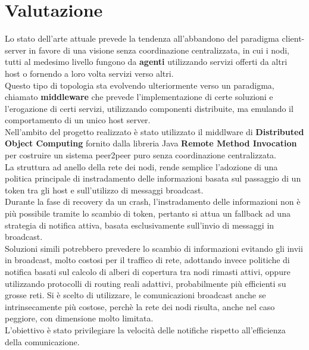\documentclass[10pt,a4paper]{article}
\begin{document}
\section{Valutazione}
Lo stato dell'arte attuale prevede la tendenza all'abbandono del paradigma client-server in favore di una visione senza coordinazione centralizzata, in cui i nodi, tutti al medesimo livello fungono da \textbf{agenti} utilizzando servizi offerti da altri host o fornendo a loro volta servizi verso altri.\\ Questo tipo di topologia sta evolvendo ulteriormente verso un paradigma, chiamato \textbf{middleware} che prevede l'implementazione di certe soluzioni e l'erogazione di certi servizi, utilizzando componenti distribuite, ma emulando il comportamento di un unico host server. \\ Nell'ambito del progetto realizzato è stato utilizzato il middlware di \textbf{Distributed Object Computing} fornito dalla libreria Java \textbf{Remote Method Invocation} per costruire un sistema peer2peer puro senza coordinazione centralizzata.\\La struttura ad anello della rete dei nodi, rende semplice l'adozione di una politica principale di instradamento delle informazioni basata sul passaggio di un token tra gli host e sull'utilizzo di messaggi broadcast.\\ Durante la fase di recovery da un crash, l'instradamento delle informazioni non è più possibile tramite lo scambio di token, pertanto si attua un fallback ad una strategia di notifica attiva, basata esclusivamente sull'invio di messaggi in broadcast.\\ Soluzioni simili potrebbero prevedere lo scambio di informazioni evitando gli invii in broadcast, molto costosi per il traffico di rete, adottando invece politiche di notifica basati sul calcolo di alberi di copertura tra nodi rimasti attivi, oppure utilizzando protocolli di routing reali adattivi, probabilmente più efficienti su grosse reti. Si è scelto di utilizzare, le comunicazioni broadcast anche se intrinsecamente più costose, perchè la rete dei nodi risulta, anche nel caso peggiore, con dimensione molto limitata.\\ L'obiettivo è stato privilegiare la velocità delle notifiche rispetto all'efficienza della comunicazione. 
\end{document}
